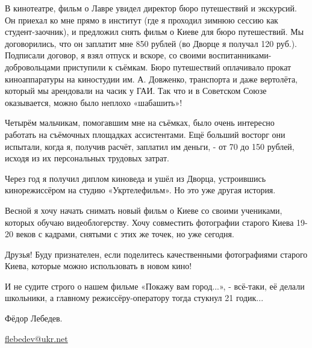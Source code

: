 В кинотеатре, фильм о Лавре увидел директор бюро путешествий и экскурсий. Он
приехал ко мне прямо в институт (где я проходил зимнюю сессию как
студент-заочник), и  предложил снять фильм о Киеве для бюро путешествий. Мы
договорились, что он заплатит мне 850 рублей (во Дворце я получал 120 руб.).
Подписали договор, я взял отпуск и вскоре, со своими
воспитанниками-добровольцами приступили к съёмкам. Бюро путешествий оплачивало
прокат киноаппаратуры на киностудии им. А. Довженко, транспорта и даже вертолёта,
который мы арендовали на часик у ГАИ. Так что и в Советском Союзе оказывается,
можно было неплохо «шабашить»!


Четырём мальчикам, помогавшим мне на съёмках, было очень интересно работать на
съёмочных площадках ассистентами. Ещё больший восторг они испытали, когда я,
получив расчёт, заплатил им деньги, - от 70 до 150 рублей, исходя из их
персональных  трудовых затрат.


Через год я получил диплом киноведа и ушёл из Дворца, устроившись
кинорежиссёром на студию «Укртелефильм». Но это уже другая история. 


Весной я хочу начать снимать новый фильм о Киеве со своими учениками, которых
обучаю видеоблогерству. Хочу совместить фотографии старого Киева 19\hyp 20 веков с
кадрами, снятыми с этих же точек, но уже сегодня.


Друзья! Буду признателен, если поделитесь качественными фотографиями старого
Киева, которые можно использовать в новом кино!

И не судите строго о нашем фильме «Покажу вам город...», - всё-таки, её делали
школьники, а главному режиссёру\hyp оператору тогда стукнул 21 годик...

Фёдор Лебедев.

\url{flebedev@ukr.net}

